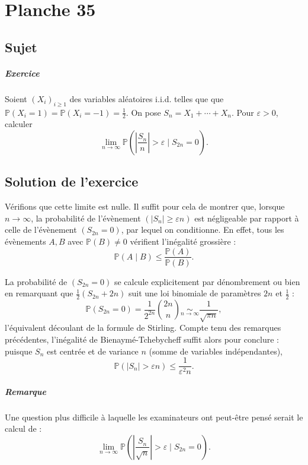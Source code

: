 \chapter{Planche 35}

\section{Sujet}

\paragraph{Exercice}
Soient $(X_i)_{i\geqslant 1}$ des variables aléatoires i.i.d. telles que que $\mathbb P(X_i = 1) = \mathbb P(X_i = -1) = \frac12.$
On pose $S_n = X_1 + \cdots + X_n$.
Pour $\varepsilon > 0$, calculer
\[
\lim_{n\to\infty} \mathbb P\left(\left|\frac{S_n}n\right| > \varepsilon \mid S_{2n} = 0\right).
\]

\section{Solution de l'exercice}
Vérifions que cette limite est nulle.
Il suffit pour cela de montrer que, lorsque $n \to \infty$, la probabilité de l'évènement $(|S_n| \geq \varepsilon n)$ est négligeable par rapport à celle de l'évènement $(S_{2n} = 0)$, par lequel on conditionne. En effet, tous les évènements $A,B$ avec $\mathbb P(B) \neq 0$ vérifient l'inégalité grossière :
\[
\mathbb P(A \mid B) \leqslant \frac{\mathbb P(A)}{\mathbb P(B)}.
\]

La probabilité de $(S_{2n} = 0)$ se calcule explicitement par dénombrement ou bien en remarquant que $\frac12(S_{2n}+{2n})$ suit une loi binomiale de paramètres $2n$ et $\frac12$ :
\[
\mathbb P(S_{2n} = 0) = \frac1{2^{2n}}\binom{2n}{n} \underset{n\to\infty}{\sim} \frac 1{\sqrt{\pi n}},
\]
l'équivalent découlant de la formule de Stirling. Compte tenu des remarques précédentes, l'inégalité de Bienaymé-Tchebycheff suffit alors pour conclure : puisque $S_n$ est centrée et de variance $n$ (somme de variables indépendantes),
\[
 \mathbb P\left(|S_n| > \varepsilon n\right) \leqslant \frac{1}{\varepsilon^2 n}.
\]

\paragraph{Remarque}
Une question plus difficile à laquelle les examinateurs ont peut-être pensé serait le calcul de :
\[
\lim_{n\to\infty} \mathbb P\left(\left|\frac{S_n}{\sqrt n}\right| > \varepsilon \mid S_{2n} = 0\right).
\]

